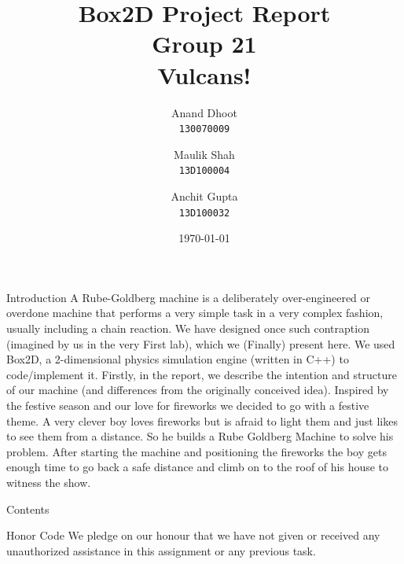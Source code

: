 \documentclass[a4paper,12pt]{article}
\begin{document}
\title{Box2D Project Report \\  Group 21 \\ Vulcans! \bigskip}
\author{
  Anand Dhoot\\
  \texttt{130070009}
  \and
  Maulik Shah\\
  \texttt{13D100004}
  \and
  Anchit Gupta\\
  \texttt{13D100032}
}
\date{\today}
\maketitle

\pagebreak
\begin{section}{Introduction}
\label{sec:Intro}
A Rube-Goldberg machine is a deliberately over-engineered or overdone machine that performs a very simple task in a very complex fashion, usually including a chain reaction. We have designed once such contraption (imagined by us in the very First lab), which we (Finally) present here. We used Box2D, a 2-dimensional physics simulation engine (written in C++) to code/implement it. Firstly, in the report, we describe the intention and structure of our machine (and differences from the originally conceived idea).
\linebreak
\linebreak
Inspired by the festive season and our love for fireworks we decided to go with a festive theme. A very clever boy loves fireworks but is
afraid to light them and just likes to see them from a distance. So he builds a Rube Goldberg Machine to solve his problem.
After starting the machine and positioning the fireworks the boy gets enough time to go back a safe distance and climb on to the roof of his house to witness the show.
\end{section}
\bigskip
\pagebreak

\begin{section}{Contents}
\tableofcontents
\end{section}
\pagebreak

\begin{section}{Honor Code}
We pledge on our honour that we have not given or received any unauthorized assistance in this assignment or any previous task.
\end{section}
\bigskip
\end{document}
